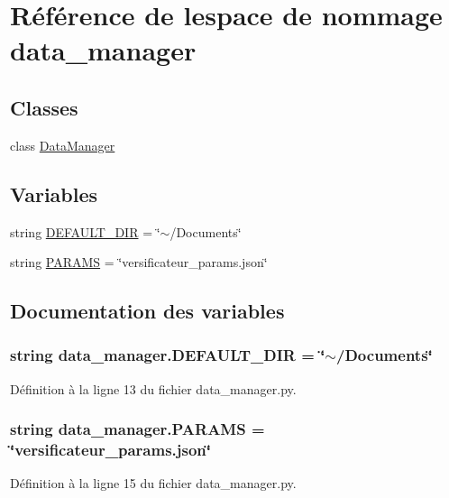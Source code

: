 \hypertarget{namespacedata__manager}{}\section{Référence de l\textquotesingle{}espace de nommage data\+\_\+manager}
\label{namespacedata__manager}
\subsection*{Classes}
\begin{DoxyCompactItemize}
\item 
class \hyperlink{classdata__manager_1_1_data_manager}{Data\+Manager}
\end{DoxyCompactItemize}
\subsection*{Variables}
\begin{DoxyCompactItemize}
\item 
string \hyperlink{namespacedata__manager_ae9aa364dc3a7580cf296095361d5a438}{D\+E\+F\+A\+U\+L\+T\+\_\+\+D\+I\+R} = \char`\"{}$\sim$/Documents\char`\"{}
\item 
string \hyperlink{namespacedata__manager_aeab1b549a085552fa1905bc868c5731e}{P\+A\+R\+A\+M\+S} = \char`\"{}versificateur\+\_\+params.\+json\char`\"{}
\end{DoxyCompactItemize}


\subsection{Documentation des variables}
\hypertarget{namespacedata__manager_ae9aa364dc3a7580cf296095361d5a438}{}
\subsubsection[{D\+E\+F\+A\+U\+L\+T\+\_\+\+D\+I\+R}]{\setlength{\rightskip}{0pt plus 5cm}string data\+\_\+manager.\+D\+E\+F\+A\+U\+L\+T\+\_\+\+D\+I\+R = \char`\"{}$\sim$/Documents\char`\"{}}\label{namespacedata__manager_ae9aa364dc3a7580cf296095361d5a438}


Définition à la ligne 13 du fichier data\+\_\+manager.\+py.

\hypertarget{namespacedata__manager_aeab1b549a085552fa1905bc868c5731e}{}
\subsubsection[{P\+A\+R\+A\+M\+S}]{\setlength{\rightskip}{0pt plus 5cm}string data\+\_\+manager.\+P\+A\+R\+A\+M\+S = \char`\"{}versificateur\+\_\+params.\+json\char`\"{}}\label{namespacedata__manager_aeab1b549a085552fa1905bc868c5731e}


Définition à la ligne 15 du fichier data\+\_\+manager.\+py.

